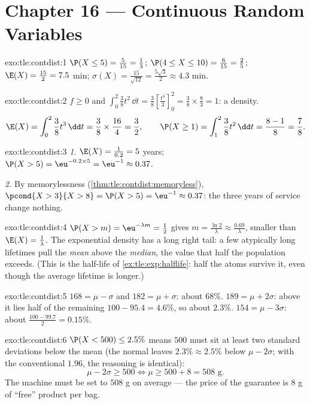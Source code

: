\section*{Chapter 16 --- Continuous Random Variables}

\begin{solution}{exo:tle:contdist:1}
$\P(X \leq 5) = \frac{5}{15} = \frac13$;
$\P(4 \leq X \leq 10) = \frac{6}{15} = \frac25$;
$\E(X) = \frac{15}{2} = 7.5$ min;
$\sigma(X) = \frac{15}{\sqrt{12}} = \frac{5\sqrt3}{2} \approx 4.3$ min.
\end{solution}

\begin{solution}{exo:tle:contdist:2}
$f \geq 0$ and
$\int_0^2 \frac38 t^2\,\dd t = \frac38\left[\frac{t^3}{3}\right]_0^2
= \frac38 \times \frac83 = 1$: a density.
\[
\E(X) = \int_0^2 \frac38 t^3\,\dd t = \frac38 \times \frac{16}{4} = \frac32,
\qquad
\P(X \geq 1) = \int_1^2 \frac38 t^2\,\dd t = \frac{8 - 1}{8} = \frac78 .
\]
\end{solution}

\begin{solution}{exo:tle:contdist:3}
\emph{1.} $\E(X) = \frac{1}{0.2} = 5$ years;
$\P(X > 5) = \eu^{-0.2\times5} = \eu^{-1} \approx 0.37$.

\emph{2.} By memorylessness (\cref{thm:tle:contdist:memoryless}),
$\pcond{X > 3}{X > 8} = \P(X > 5) = \eu^{-1} \approx 0.37$: the three years
of service change nothing.
\end{solution}

\begin{solution}{exo:tle:contdist:4}
$\P(X > m) = \eu^{-\lambda m} = \frac12$ gives
$m = \frac{\ln 2}{\lambda} \approx \frac{0.69}{\lambda}$, smaller than
$\E(X) = \frac1\lambda$. The exponential density has a long right tail: a
few atypically long lifetimes pull the \emph{mean} above the
\emph{median}, the value that half the population exceeds. (This is the
half-life of \cref{ex:tle:exp:halflife}: half the atoms survive it, even
though the average lifetime is longer.)
\end{solution}

\begin{solution}{exo:tle:contdist:5}
$168 = \mu - \sigma$ and $182 = \mu + \sigma$: about $68\%$.
$189 = \mu + 2\sigma$: above it lies half of the remaining
$100 - 95.4 = 4.6\%$, so about $2.3\%$.
$154 = \mu - 3\sigma$: about $\frac{100 - 99.7}{2} = 0.15\%$.
\end{solution}

\begin{solution}{exo:tle:contdist:6}
$\P(X < 500) \leq 2.5\%$ means $500$ must sit at least two standard
deviations below the mean (the normal leaves $2.3\% \approx 2.5\%$ below
$\mu - 2\sigma$; with the conventional $1.96$, the reasoning is identical):
\[
\mu - 2\sigma \geq 500 \iff \mu \geq 500 + 8 = 508 \text{ g}.
\]
The machine must be set to $508$ g on average --- the price of the
guarantee is $8$ g of ``free'' product per bag.
\end{solution}

